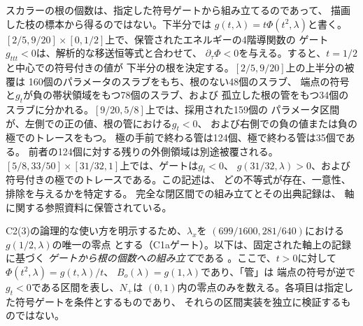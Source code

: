 スカラーの根の個数は、指定した符号ゲートから組み立てるのであって、
描画した枝の標本から得るのではない。下半分では
$g(t,\lambda)=t\Phi(t^2,\lambda)$と書く。
$[2/5,9/20]\times[0,1/2]$上で、保管されたエネルギーの4階導関数の
ゲート$g_{ttt}<0$は、解析的な移送恒等式と合わせて、
$\partial_\tau\Phi<0$を与える。すると、$t=1/2$と中心での符号付きの値が
下半分の根を決定する。$[2/5,9/20]$上の上半分の被覆は
160個のパラメータのスラブをもち、根のない48個のスラブ、
端点の符号と$g_t$が負の帯状領域をもつ78個のスラブ、および
孤立した根の管をもつ34個のスラブに分かれる。$[9/20,5/8]$上では、採用された159個の
パラメータ区間が、左側での正の値、根の管における$g_t<0$、
および右側での負の値または負の極でのトレースをもつ。
極の手前で終わる管は124個、極で終わる管は35個である。
前者の124個に対する残りの外側領域は別途被覆される。
$[5/8,33/50]\times[31/32,1]$上では、ゲートは$g_t<0$、
$g(31/32,\lambda)>0$、および符号付きの極でのトレースである。この記述は、
どの不等式が存在、一意性、排除を与えるかを特定する。
完全な閉区間での組み立てとその出典記録は、
軸に関する参照資料に保管されている\citep{data-oblate-axis}。

C2(3)の論理的な使い方を明示するため、$\lambda_x$を
$(699/1600,281/640)$における$g(1/2,\lambda)$の唯一の零点
とする（C1aゲート）。以下は、固定された軸上の記録に基づく
\emph{ゲートから根の個数への組み立て}である
\citep{data-oblate-axis}。ここで、$t>0$に対して$\Phi(t^2,\lambda)=g(t,\lambda)/t$、
$B_o(\lambda)=g(1,\lambda)$であり、「管」は
端点の符号が逆で$g_t<0$である区間を表し、$N_+$は
$(0,1)$内の零点のみを数える。各項目は指定した符号ゲートを条件とするものであり、
それらの区間実装を独立に検証するものではない。

